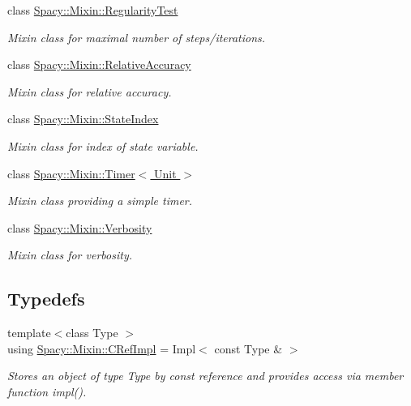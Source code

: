\begin{DoxyCompactItemize}
class \hyperlink{classSpacy_1_1Mixin_1_1RegularityTest}{Spacy\+::\+Mixin\+::\+Regularity\+Test}
\begin{DoxyCompactList}\small\item\em Mixin class for maximal number of steps/iterations. \end{DoxyCompactList}\item 
class \hyperlink{classSpacy_1_1Mixin_1_1RelativeAccuracy}{Spacy\+::\+Mixin\+::\+Relative\+Accuracy}
\begin{DoxyCompactList}\small\item\em Mixin class for relative accuracy. \end{DoxyCompactList}\item 
class \hyperlink{classSpacy_1_1Mixin_1_1StateIndex}{Spacy\+::\+Mixin\+::\+State\+Index}
\begin{DoxyCompactList}\small\item\em Mixin class for index of state variable. \end{DoxyCompactList}\item 
class \hyperlink{classSpacy_1_1Mixin_1_1Timer}{Spacy\+::\+Mixin\+::\+Timer$<$ Unit $>$}
\begin{DoxyCompactList}\small\item\em Mixin class providing a simple timer. \end{DoxyCompactList}\item 
class \hyperlink{classSpacy_1_1Mixin_1_1Verbosity}{Spacy\+::\+Mixin\+::\+Verbosity}
\begin{DoxyCompactList}\small\item\em Mixin class for verbosity. \end{DoxyCompactList}\end{DoxyCompactItemize}
\subsection*{Typedefs}
\begin{DoxyCompactItemize}
\item 
\hypertarget{group__MixinGroup_ga3289264a84ff7bc4942d07318a22bfd7}{}{\footnotesize template$<$class Type $>$ }\\using \hyperlink{group__MixinGroup_ga3289264a84ff7bc4942d07318a22bfd7}{Spacy\+::\+Mixin\+::\+C\+Ref\+Impl} = Impl$<$ const Type \& $>$\label{group__MixinGroup_ga3289264a84ff7bc4942d07318a22bfd7}

\begin{DoxyCompactList}\small\item\em Stores an object of type Type by const reference and provides access via member function impl(). \end{DoxyCompactList}\end{DoxyCompactItemize}


